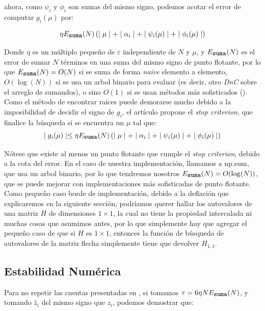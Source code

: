 \documentclass[11pt,a4paper]{article}
\begin{document}
\normalsize ahora, como $\psi_i$ y $\phi_i$ son sumas del mismo signo, podemos acotar el error de computar $g_i(\mu)$ por:

$$\eta E_{\texttt{\small suma}}(N) \left(\mid \mu \mid+ \mid \alpha_i \mid+ \mid \psi_i(\mu) \mid + \mid \phi_i(\mu) \mid\right)$$

Donde $\eta$ es un múltiplo pequeño de $\varepsilon$ independiente de $N$ y $\mu$, y $E_{\texttt{\small suma}}(N)$ es el error de sumar $N$ términos en una suma del mismo signo de punto flotante, por lo que $E_{\texttt{\small suma}}(N) = O(N)$ si se suma de forma \textit{naive} elemento a elemento, $O(\log(N))$ si se usa un arbol binario para evaluar (es decir, otro \textit{DnC} sobre el arreglo de sumandos), o sino $O(1)$ si se usan métodos más sofisticados (\cite{ExactSum}).\\

Como el método de encontrar raíces puede demorarse mucho debido a la imposibilidad de decidir el signo de $g_i$, el artículo \cite{gu1995} propone el \textit{stop criterion}, que finalice la búsqueda si se encuentra un $\mu$ tal que:
$$\mid g_i (\mu) \mid \leq \eta E_{\texttt{\small suma}}(N) \left(\mid \mu \mid+ \mid \alpha_i \mid+ \mid \psi_i(\mu) \mid + \mid \phi_i(\mu) \mid\right)$$

Nótese que existe al menos un punto flotante que cumple el \textit{stop criterion}, debido a la cota del error. En el caso de nuestra implementación, llamamos a \rm{np.sum}, que usa un arbol binario, por lo que tendremos nosotros $ E_{\texttt{\small suma}}(N)=O(\log(N))$, que se puede mejorar con implementaciones más sofisticadas de punto flotante. \\

Como pequeño caso borde de implementación, debido a la deflación que explicaremos en la siguiente sección, podríamos querer hallar los autovalores de una matriz $H$ de dimensiones $1 \times 1$, la cual no tiene la propiedad intercalada ni muchas cosas que asumimos antes, por lo que simplemente hay que agregar el pequeño caso de que si $H$ es  $1 \times 1$, entonces la función de búsqueda de autovalores de la matriz flecha simplemente tiene que devolver $H_{1,1}$.\\

\subsection{Estabilidad Numérica}

Para no repetir las cuentas presentadas en \cite{gu1995}, si tomamos $\tau=6 \eta N E_{\texttt{\small suma}}(N)$, y tomando $\hat{z}_i$ del mismo signo que $z_i$, podemos demostrar que:
\end{document}
